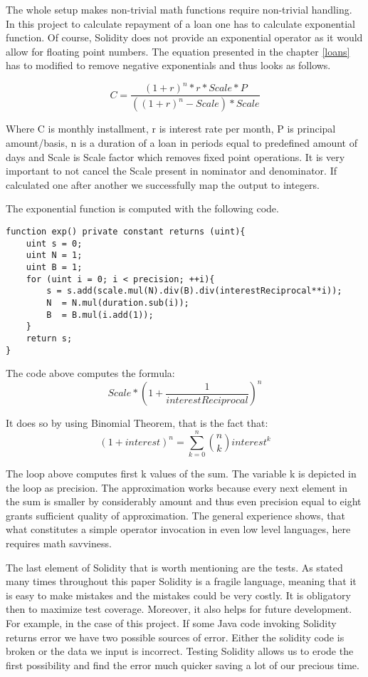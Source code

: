 \documentclass[a4paper,12pt,twoside,openany]{report}
\begin{document}
The whole setup makes non-trivial math functions require non-trivial handling. In this project to calculate repayment of a loan one has to calculate exponential function. Of course, Solidity does not provide an exponential operator as it would allow for floating point numbers. The equation presented in the chapter \ref{loans} has to modified to remove negative exponentials and thus looks as follows.
	
\[C = \frac{(1+r)^n * r * Scale * P}{((1+r)^n - Scale) * Scale}	\]

Where C is monthly installment, r is interest rate per month, P is principal amount/basis, n is a duration of a loan in periods equal to predefined amount of days and Scale is Scale factor which removes fixed point operations. It is very important to not cancel the Scale present in nominator and denominator. If calculated one after another we successfully map the output to integers.

The exponential function is computed with the following code.
\begin{lstlisting}
function exp() private constant returns (uint){
	uint s = 0;
	uint N = 1;
	uint B = 1;
	for (uint i = 0; i < precision; ++i){
		s = s.add(scale.mul(N).div(B).div(interestReciprocal**i));
	    N  = N.mul(duration.sub(i));
	    B  = B.mul(i.add(1));
	}
	return s;
}
\end{lstlisting}

The code above computes the formula:
\[	Scale * (1 + \frac{1}{interestReciprocal})^n \]

It does so by using Binomial Theorem, that is the fact that:
\[	(1 + interest)^n = \sum_{k=0}^n {n \choose k} interest^k \]

The loop above computes first k values of the sum. The variable k is depicted in the loop as precision. The approximation works because every next element in the sum is smaller by considerably amount and thus even precision equal to eight grants sufficient quality of approximation. The general experience shows, that what constitutes a simple operator invocation in even low level languages, here requires math savviness.

The last element of Solidity that is worth mentioning are the tests. As stated many times throughout this paper Solidity is a fragile language, meaning that it is easy to make mistakes and the mistakes could be very costly. It is obligatory then to maximize test coverage. Moreover, it also helps for future development. For example, in the case of this project. If some Java code invoking Solidity returns error we have two possible sources of error. Either the solidity code is broken or the data we input is incorrect. Testing Solidity allows us to erode the first possibility and find the error much quicker saving a lot of our precious time. 
\end{document}

